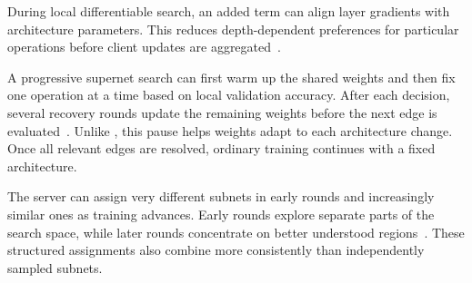  During local differentiable search, an added term can align layer gradients with architecture parameters. This reduces depth-dependent preferences for particular operations before client updates are aggregated~\cite{remote_sensing_fednas_2025}.

 A progressive supernet search can first warm up the shared weights and then fix one operation at a time based on local validation accuracy. After each decision, several recovery rounds update the remaining weights before the next edge is evaluated~\cite{spider_2021}. Unlike , this pause helps weights adapt to each architecture change. Once all relevant edges are resolved, ordinary training continues with a fixed architecture.

 The server can assign very different subnets in early rounds and increasingly similar ones as training advances. Early rounds explore separate parts of the search space, while later rounds concentrate on better understood regions~\cite{divide-and-conquer_fednas_2023}. These structured assignments also combine more consistently than independently sampled subnets.

